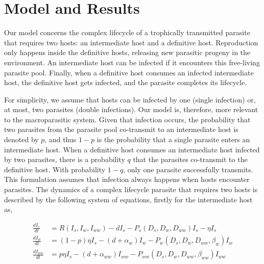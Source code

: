 \documentclass[11pt]{article}
\begin{document}
\section*{Model and Results}

Our model concerns the complex lifecycle of a trophically transmitted parasite that requires two hosts: an intermediate host and a definitive host. 
Reproduction only happens inside the definitive hosts, releasing new parasitic progeny in the environment. 
An intermediate host can be infected if it encounters this free-living parasite pool. 
Finally, when a definitive host consumes an infected intermediate host, the definitive host gets infected, and the parasite completes its lifecycle.

For simplicity, we assume that hosts can be infected by one (single infection) or, at most, two parasites (double infections). 
Our model is, therefore, more relevant to the macroparasitic system.
Given that infection occurs, the probability that two parasites from the parasite pool co-transmit to an intermediate host is denoted by  $p$, and thus $1-p$ is the probability that a single parasite enters an intermediate host. 
When a definitive host consumes an intermediate host infected by two parasites, there is a probability $q$ that the parasites co-transmit to the definitive host.
With probability $1-q$, only one parasite successfully transmits. 
This formulation assumes that infection always happens when hosts encounter parasites.
The dynamics of a complex lifecycle parasite that requires two hosts is described by the following system of equations, firstly for the intermediate host as,

\begin{align}
\frac{dI_s}{dt} &= R(I_s, I_w, I_{ww}) - d I_s - P_s(D_s, D_w, D_{ww}) I_s  - \eta  I_s \nonumber \\ 
\frac{dI_w}{dt} &=  (1 - p) \eta I_s  - (d + \alpha_w) I_w - P_w(D_s, D_w, D_{ww}, \beta_w) I_w \label{odes:ihosts} \\
\frac{dI_{ww}}{dt} &= p \eta I_s  - (d + \alpha_{ww}) I_{ww} - P_{ww}(D_s, D_w, D_{ww}, \beta_{ww}) I_{ww} \nonumber
\end{align}
\end{document}
